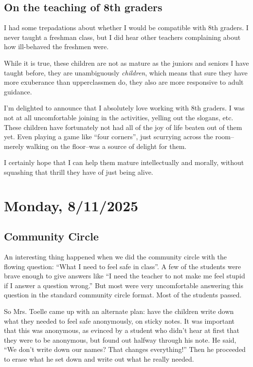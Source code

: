 \documentclass[11pt]{elegantbook}
\begin{document}
\section*{On the teaching of 8th graders}

I had some trepadations about whether I would be compatible with 8th
graders.  I never taught a freshman class, but I did hear other
teachers complaining about how ill-behaved the freshmen were.

While it is true, these children are not as mature as the juniors and
seniors I have taught before, they are unambiguously {\em children},
which means that sure they have more exuberance than upperclassmen do,
they also are more responsive to adult guidance.   

I'm delighted to announce that I absolutely love working with 8th graders.
I was not at all uncomfortable joining in the activities, yelling out
the slogans, etc.  These children have fortunately not had all of the joy
of life beaten out of them yet.  Even playing a game like ``four corners'',
just scurrying across the room--merely walking on the floor--was a
source of delight for them.

I certainly hope that I can help them mature intellectually and
morally, without squashing that thrill they have of just being alive.

\chapter{Monday, 8/11/2025}

\section*{Community Circle}

An interesting thing happened when we did the community circle with
the flowing question: ``What I need to feel safe in class''.  A few of
the students were brave enough to give answers like ``I need the
teacher to not make me feel stupid if I answer a question wrong.''
But most were very uncomfortable answering this question in the
standard community circle format.  Most of the students passed.

So Mrs. Toelle came up with an alternate plan: have the children write
down what they needed to feel safe anonymously, on sticky notes.
It was important that this was anonymous, as evinced by a student
who didn't hear at first that they were to be anonymous, but found out
halfway through his note.  He said, ``We don't write down our names?
That changes everything!''  Then he proceeded to erase what he set down
and write out what he really needed.
\end{document}
